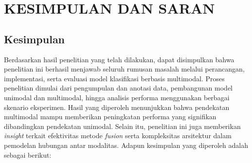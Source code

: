 \newpage
\chapter{KESIMPULAN DAN SARAN} \label{Bab V}

\section{Kesimpulan} \label{V.Kesimpulan}
Berdasarkan hasil penelitian yang telah dilakukan, dapat disimpulkan bahwa penelitian ini berhasil menjawab seluruh rumusan masalah melalui perancangan, implementasi, serta evaluasi model klasifikasi berbasis multimodal. Proses penelitian dimulai dari pengumpulan dan anotasi data, pembangunan model unimodal dan multimodal, hingga analisis performa menggunakan berbagai skenario eksperimen. Hasil yang diperoleh menunjukkan bahwa pendekatan multimodal mampu memberikan peningkatan performa yang signifikan dibandingkan pendekatan unimodal. Selain itu, penelitian ini juga memberikan \textit{insight} terkait efektivitas metode \textit{fusion} serta kompleksitas arsitektur dalam pemodelan hubungan antar modalitas. Adapun kesimpulan yang diperoleh adalah sebagai berikut:

